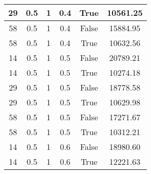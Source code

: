 \documentclass[12pt]{article}
\begin{document}
\begin{table}[h!]
\begin{tabular}{|c|c|c|c|c|c|}
29  &  0.5  &  1  &  0.4  &  True  &  10561.25\\ \hline
58  &  0.5  &  1  &  0.4  &  False  &  15884.95\\ \hline
58  &  0.5  &  1  &  0.4  &  True  &  10632.56\\ \hline
14  &  0.5  &  1  &  0.5  &  False  &  20789.21\\ \hline
14  &  0.5  &  1  &  0.5  &  True  &  10274.18\\ \hline
29  &  0.5  &  1  &  0.5  &  False  &  18778.58\\ \hline
29  &  0.5  &  1  &  0.5  &  True  &  10629.98\\ \hline
58  &  0.5  &  1  &  0.5  &  False  &  17271.67\\ \hline
58  &  0.5  &  1  &  0.5  &  True  &  10312.21\\ \hline
14  &  0.5  &  1  &  0.6  &  False  &  18980.60\\ \hline
14  &  0.5  &  1  &  0.6  &  True  &  12221.63\\ \hline
\end{tabular}
\end{table}
\end{document}
